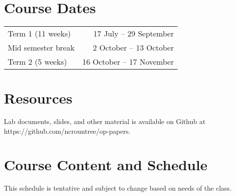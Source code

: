 \documentclass{article}
\begin{document}
\section*{Course Dates}
\begin{tabular}{lr}
Term 1 (11 weeks) & 17 July -- 29 September \\
Mid semester break & 2 October -- 13 October \\
Term 2 (5 weeks) & 16 October -- 17 November \\
\end{tabular}


\section*{Resources}

Lab documents, slides, and other material is available on Github at https://github.com/ncrountree/op-papers.

\newpage 

\section*{Course Content and Schedule}
This schedule is tentative and subject to change based on needs of the class.
\end{document}
